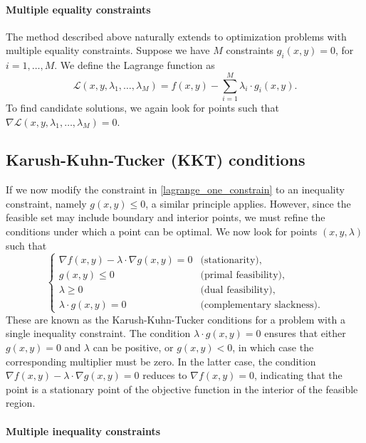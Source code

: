 \documentclass{amsart}
\begin{document}
\bigskip

\paragraph{\bf Multiple equality constraints}

The method described above naturally extends to optimization problems with multiple equality constraints. Suppose we have $M$ constraints $g_i(x,y)=0$, for $i=1,\ldots, M$. We define the Lagrange function as
\[
    \mathcal{L}(x,y,\lambda_1,\ldots,\lambda_M)= f(x,y) -\sum_{i=1}^M \lambda_i\cdot g_i(x,y).
\]
To find candidate solutions, we again look for points such that $\nabla\mathcal{L}(x,y,\lambda_1,\ldots,\lambda_M)=0$.

\subsection{Karush-Kuhn-Tucker (KKT) conditions}

If we now modify the constraint in \eqref{lagrange_one_constrain} to an inequality constraint, namely $g(x,y)\leq 0$, a similar principle applies. However, since the feasible set may include boundary and interior points, we must refine the conditions under which a point can be optimal. We now look for points $(x,y,\lambda)$ such that
\[\begin{cases}
    \nabla f(x,y) -\lambda\cdot \nabla g(x,y)= 0 & \text{(stationarity)},\\
    g(x,y)\leq 0 & \text{(primal feasibility)},\\
    \lambda\geq 0 & \text{(dual feasibility)},\\
    \lambda\cdot g(x,y)=0 & \text{(complementary slackness)}.
\end{cases}\]
These are known as the Karush-Kuhn-Tucker conditions for a problem with a single inequality constraint. The condition $\lambda\cdot g(x,y)=0$ ensures that either $g(x,y)=0$ and $\lambda$ can be positive, or $g(x,y)<0$, in which case the corresponding multiplier must be zero. In the latter case, the condition $\nabla f(x,y) -\lambda\cdot \nabla g(x,y)= 0$ reduces to $\nabla f(x,y)=0$, indicating that the point is a stationary point of the objective function in the interior of the feasible region.

\bigskip

\paragraph{\bf Multiple inequality constraints}
\end{document}
